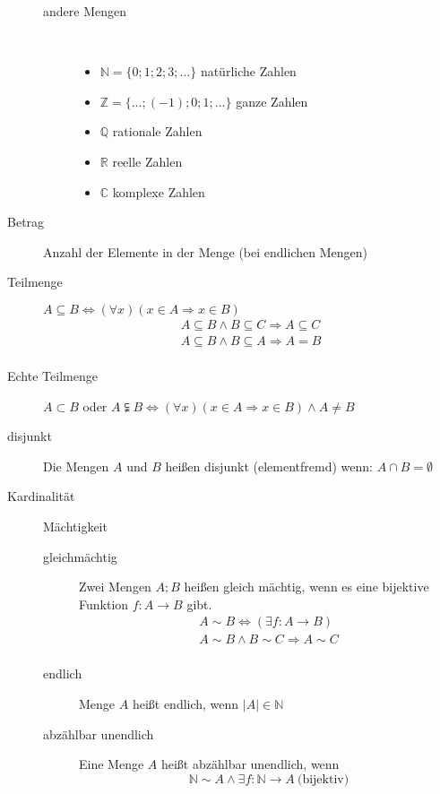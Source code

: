 \begin{description}
\begin{description}
        \item[andere Mengen] \
        \begin{itemize}
            \item $\mathbb{N} = \lbrace 0;1;2;3;\dots \rbrace$ natürliche Zahlen
            \item $\mathbb{Z} = \lbrace \dots; (-1);0;1;\dots \rbrace$ ganze Zahlen
            \item $\mathbb{Q}$ rationale Zahlen
            \item $\mathbb{R}$ reelle Zahlen
            \item $\mathbb{C}$ komplexe Zahlen
        \end{itemize}
    \end{description}
    \item[Betrag] Anzahl der Elemente in der Menge (bei endlichen Mengen)
    \item[Teilmenge] $A \subseteq B \Leftrightarrow (\forall x)(x \in A \Rightarrow x \in B)$
    \begin{gather*}
        A \subseteq B \wedge B \subseteq C \Rightarrow A \subseteq C\\
        A \subseteq B \wedge B \subseteq A \Rightarrow A = B\\
    \end{gather*}
    \item[Echte Teilmenge] $A \subset B$ oder $A \subsetneqq B \Leftrightarrow (\forall x)(x \in A \Rightarrow x \in B) \wedge A \not = B $
    \item[disjunkt] Die Mengen $A$ und $B$ heißen disjunkt (elementfremd) wenn: $A \cap B = \emptyset$
    \item[Kardinalität] Mächtigkeit
    \begin{description}
        \item[gleichmächtig] Zwei Mengen $A;B$ heißen gleich mächtig, wenn es eine bijektive Funktion $f : A \longrightarrow B$ gibt.
        \begin{gather*}
            A \sim B \Leftrightarrow (\exists f : A \longrightarrow B)\\
            A \sim B \wedge B \sim C \Rightarrow A \sim C\\
        \end{gather*}
        \item[endlich] Menge $A$ heißt endlich, wenn $|A| \in \mathbb{N}$
        \item[abzählbar unendlich ] Eine Menge $A$ heißt abzählbar unendlich, wenn \[\mathbb{N} \sim A \wedge \exists f : \mathbb{N} \longrightarrow A\ \textrm{(bijektiv)}\]

\end{description}
\end{description}
